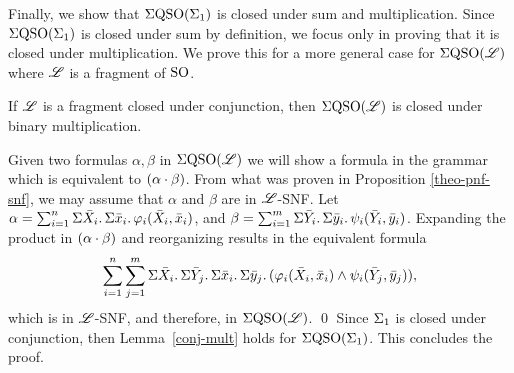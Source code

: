 Finally, we show that $\Sigma{\rm QSO}(\Sigma_{1})$ is closed under sum and multiplication. 
Since $\Sigma{\rm QSO}(\Sigma_{1})$ is closed under sum by definition, we focus only in proving that it is closed under multiplication. 
We prove this for a more general case for $\Sigma{\rm QSO}(\mathscr{L})$ where $\mathscr{L}$ is a fragment of ${\rm SO}$.

\begin{lem} \label{conj-mult}
	If $\mathscr{L}$ is a fragment closed under conjunction, then $\Sigma{\rm QSO}(\mathscr{L})$ is closed under binary multiplication.
\end{lem}
\proof
	Given two formulas $\alpha, \beta$ in $\Sigma{\rm QSO}(\mathscr{L})$ we will show a formula in the grammar which is equivalent to $(\alpha\cdot \beta)$. 
	From what was proven in Proposition \ref{theo-pnf-snf}, we may assume that $\alpha$ and $\beta$ are in $\mathscr{L}$-SNF. 
	Let $\alpha = \sum_{i = 1}^n\Sigma{\bar{X}_i}.\,\Sigma{\bar{x}_i}.\,\varphi_i(\bar{X}_i,\bar{x}_i)$, and $\beta = \sum_{i = 1}^m\Sigma{\bar{Y}_i}.\,\Sigma{\bar{y}_i}.\,\psi_i(\bar{Y}_i,\bar{y}_i)$. Expanding the product in $(\alpha\cdot \beta)$ and reorganizing results in the equivalent formula
	$$
	\sum_{i = 1}^n\sum_{j = 1}^m\Sigma{\bar{X}_i}.\,\Sigma{\bar{Y}_j}.\,\Sigma{\bar{x}_i}.\,\Sigma{\bar{y}_j}.\,(\varphi_i(\bar{X}_i,\bar{x}_i)\wedge\psi_i(\bar{Y}_j,\bar{y}_j)),
	$$
	which is in $\mathscr{L}$-SNF, and therefore, in $\Sigma{\rm QSO}(\mathscr{L})$.
\qed
Since $\Sigma_{1}$ is closed under conjunction, then Lemma~\ref{conj-mult} holds for $\Sigma{\rm QSO}(\Sigma_{1})$. 
This concludes the proof.